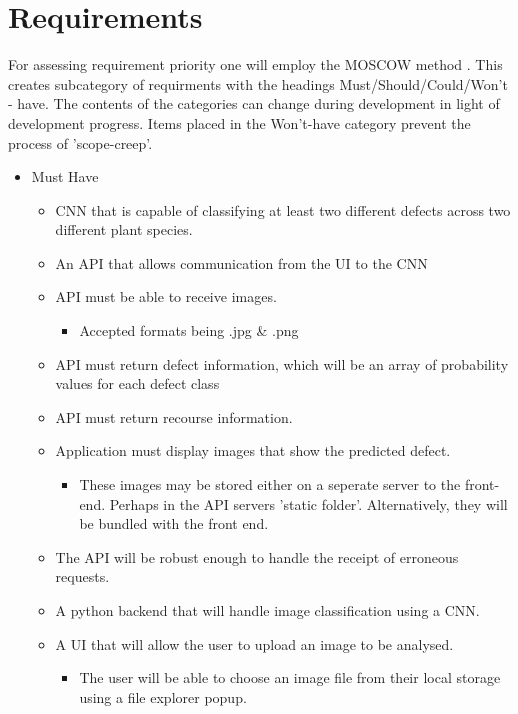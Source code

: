 \section{Requirements}
For assessing requirement priority one will employ the MOSCOW method \citep{Clegg199410.5555/561543}. This creates subcategory of requirments with the headings Must/Should/Could/Won't - have. The contents of the categories can change during development in light of development progress. Items placed in the Won't-have category prevent the process of 'scope-creep'.
\begin{itemize}
  \item Must Have
  \begin{itemize}
    \item CNN that is capable of classifying at least two different defects
      across two different plant species.
    \item An API that allows communication from the UI to the CNN
    \item API must be able to receive images.
      \begin{itemize}
        \item Accepted formats being .jpg \& .png
      \end{itemize}
    \item API must return defect information, which will be an array of probability values for each defect class
    \item API must return recourse information.
    \item Application must display images that show the predicted defect.
      \begin{itemize}
        \item These images may be stored either on a seperate server to the front-end. Perhaps in the API servers 'static folder'. Alternatively, they will be bundled with the front end.
      \end{itemize}
  	\item The API will be robust enough to handle the receipt of erroneous requests.
  	\item A python backend that will handle image classification using a CNN.
  	\item A UI that will allow the user to upload an image to be analysed.
    \begin{itemize}
      \item The user will be able to choose an image file from their local storage using a file explorer popup.
    \end{itemize}

\end{itemize}
\end{itemize}
